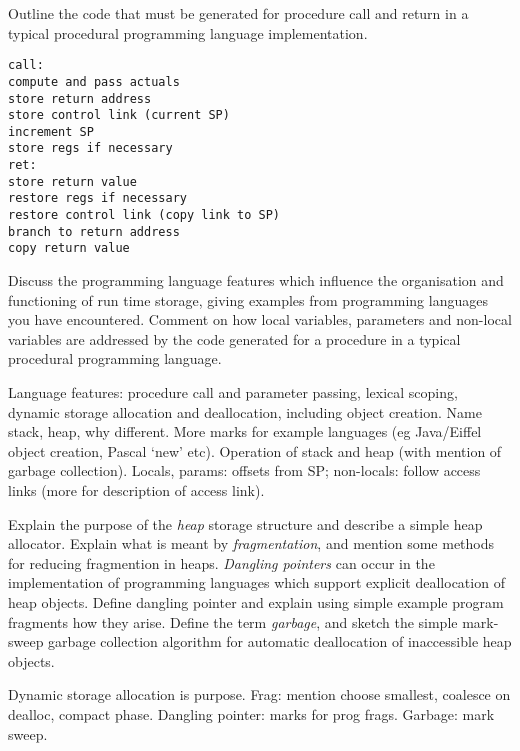 \begin{questions}
\begin{subquestions}
\begin{subsubquestions}
\end{subsubquestions}

\subquestion

Outline the code that must be generated for procedure call and return
in a typical procedural programming language implementation.
\begin{modelanswer}
\begin{verbatim}
call:
compute and pass actuals
store return address
store control link (current SP) 
increment SP
store regs if necessary
ret:
store return value
restore regs if necessary
restore control link (copy link to SP)
branch to return address
copy return value
\end{verbatim}
\end{modelanswer}


\end{subquestions}

\question

\begin{subquestions}

\subquestion
Discuss the programming language features which influence
the organisation and functioning of run time storage,
giving examples from programming languages you
have encountered. 
Comment on how local variables,
parameters and non-local variables
are addressed by the code generated for a
procedure in a typical procedural programming 
language.
\begin{modelanswer}
Language features: procedure call and parameter passing,
lexical scoping, dynamic storage allocation and deallocation,
including object creation. Name stack, heap, why different.
More marks for example languages
(eg Java/Eiffel object creation, Pascal `new' etc). 
Operation of stack and heap (with mention of garbage collection).
Locals, params: offsets from SP; non-locals: follow access links
(more for description of access link).
\end{modelanswer}


\subquestion
Explain the purpose of the {\em heap} storage structure and
describe a simple heap allocator.  Explain what is 
meant by {\em fragmentation}, and mention some methods
for reducing fragmention in heaps.  
{\em Dangling pointers}
can occur in the implementation of programming languages which
support explicit deallocation of heap objects. Define
dangling pointer and explain using simple example program
fragments how they arise.
Define the term {\em garbage}, and 
sketch the simple mark-sweep garbage collection algorithm
for automatic deallocation of inaccessible heap objects.
\begin{modelanswer}
Dynamic storage allocation is purpose. 
Frag: mention choose smallest, coalesce on dealloc, compact phase.
Dangling pointer: marks for prog frags.
Garbage: mark sweep.
\end{modelanswer}



\end{subquestions}
\end{questions}
